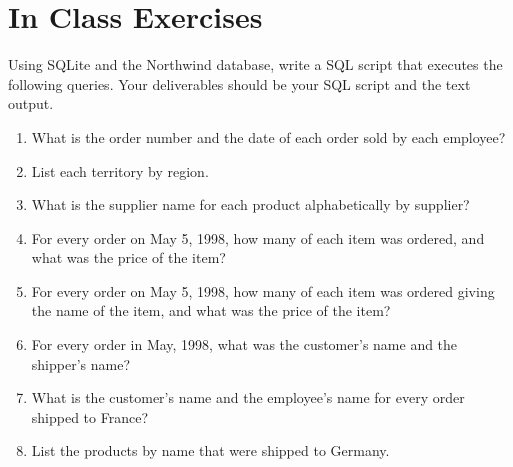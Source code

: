 \documentclass{article}
\begin{document}
    \section{In Class Exercises}
Using SQLite and the Northwind database, write a SQL script that executes the following queries. Your deliverables should be your SQL script and the text output.

        \begin{enumerate}
            \item What is the order number and the date of each order sold by each employee?
            \item List each territory by region.
            \item What is the supplier name for each product alphabetically by supplier?
            \item For every order on May 5, 1998, how many of each item was ordered, and what was the price of the item?
            \item For every order on May 5, 1998, how many of each item was ordered giving the name of the item, and what was the price of the item?
            \item For every order in May, 1998, what was the customer's name and the shipper's name?
            \item What is the customer's name and the employee's name for every order shipped to France?
            \item List the products by name that were shipped to Germany.
        \end{enumerate}
\end{document}
